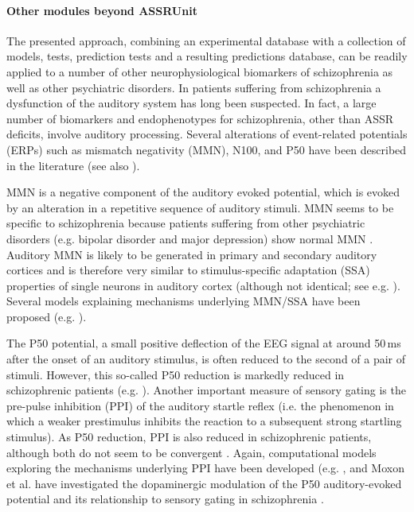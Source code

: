 \documentclass[a4paper,10pt]{article}
\begin{document}
\paragraph{Other modules beyond ASSRUnit}
The presented approach, combining an experimental database with a collection of models, tests, prediction tests and a resulting predictions database, can be readily applied 
to a number of other neurophysiological biomarkers of schizophrenia as well as other psychiatric disorders. 
In patients suffering from schizophrenia a dysfunction of the auditory system has long been suspected. In fact, a large number of biomarkers and endophenotypes for schizophrenia, other
than ASSR deficits, involve auditory processing. Several alterations of event-related potentials (ERPs) such as mismatch negativity (MMN), N100, and P50 have been described in the literature 
(see also \cite{Siekmeier2015,Shi2007}).

MMN is a negative component of the auditory evoked potential, which is evoked by an alteration in a repetitive sequence of auditory stimuli. MMN
seems to be specific to schizophrenia because patients suffering from other psychiatric disorders (e.g. bipolar disorder and major depression) show normal MMN \cite{Umbricht2003}. 
Auditory MMN is likely to be generated in primary and secondary auditory cortices and is therefore very similar  
to stimulus-specific adaptation (SSA) properties of single neurons in auditory cortex \cite{Nelken2007} (although not identical; see e.g. \cite{Farley2010,vonderBehrens2009}).
Several models explaining mechanisms underlying MMN/SSA have been proposed (e.g. \cite{Mill2011,Nelken2014}).  

The P50 potential, a small positive deflection of the EEG signal at around 50\,ms after the onset of an auditory stimulus, is often reduced to the second of a pair of stimuli.
However, this so-called P50 reduction is markedly reduced in schizophrenic patients (e.g. \cite{Braff2007}). Another important measure of sensory gating is the pre-pulse inhibition (PPI) of
the auditory startle reflex (i.e. the phenomenon in which a weaker prestimulus inhibits the reaction to a subsequent strong startling stimulus). As P50 reduction, PPI is also reduced in schizophrenic patients,
although both do not seem to be convergent \cite{Braff2007}. Again, computational models exploring the mechanisms underlying PPI have been developed (e.g. \cite{Schmajuk2005,Ramirez2012,Leumann2001}, and Moxon et al.
have investigated the dopaminergic modulation of the P50 auditory-evoked potential and its relationship to sensory gating in schizophrenia \cite{Moxon2003}.
 
\end{document}

